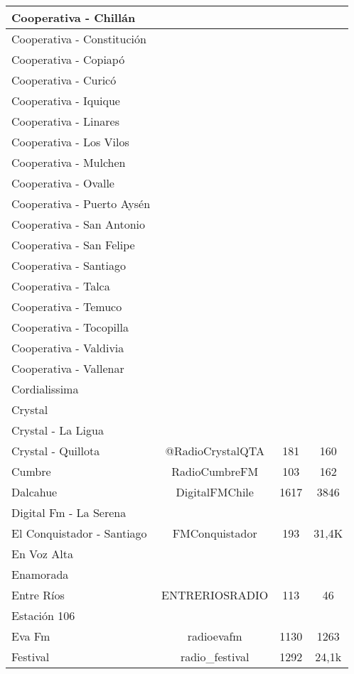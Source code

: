 \begin{center}
\begin{longtable}{| l | c | c | c |}
Cooperativa - Chillán	&		&		&		\\ \hline
Cooperativa - Constitución	&		&		&		\\ \hline
Cooperativa - Copiapó	&		&		&		\\ \hline
Cooperativa - Curicó	&		&		&		\\ \hline
Cooperativa - Iquique	&		&		&		\\ \hline
Cooperativa - Linares	&		&		&		\\ \hline
Cooperativa - Los Vilos	&		&		&		\\ \hline
Cooperativa - Mulchen	&		&		&		\\ \hline
Cooperativa - Ovalle	&		&		&		\\ \hline
Cooperativa - Puerto Aysén	&		&		&		\\ \hline
Cooperativa - San Antonio	&		&		&		\\ \hline
Cooperativa - San Felipe	&		&		&		\\ \hline
Cooperativa - Santiago	&		&		&		\\ \hline
Cooperativa - Talca	&		&		&		\\ \hline
Cooperativa - Temuco	&		&		&		\\ \hline
Cooperativa - Tocopilla	&		&		&		\\ \hline
Cooperativa - Valdivia	&		&		&		\\ \hline
Cooperativa - Vallenar	&		&		&		\\ \hline
Cordialissima	&		&		&		\\ \hline
Crystal	&		&		&		\\ \hline
Crystal - La Ligua	&		&		&		\\ \hline
Crystal - Quillota	&	@RadioCrystalQTA	&	181	&	160	\\ \hline
Cumbre	&	RadioCumbreFM	&	103	&	162	\\ \hline
Dalcahue	&	DigitalFMChile	&	1617	&	3846	\\ \hline
Digital Fm - La Serena	&		&		&		\\ \hline
El Conquistador - Santiago	&	FMConquistador	&	193	&	31,4K	\\ \hline
En Voz Alta	&		&		&		\\ \hline
Enamorada	&		&		&		\\ \hline
Entre Ríos	&	ENTRERIOSRADIO	&	113	&	46	\\ \hline
Estación 106	&		&		&		\\ \hline
Eva Fm	&	radioevafm	&	1130	&	1263	\\ \hline
Festival	&	radio\_festival	&	1292	&	24,1k	\\ \hline

\end{longtable}
\end{center}
